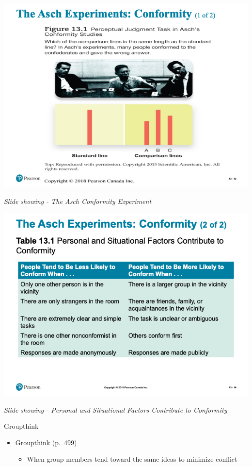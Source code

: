 \documentclass[
]{book}
\providecommand{\tightlist}{%
  \setlength{\itemsep}{0pt}\setlength{\parskip}{0pt}}
\begin{document}
\begin{reflect}
\includegraphics{assets/unit_6/slide_13.png}

\emph{Slide showing - The Asch Conformity Experiment}

\includegraphics{assets/unit_6/slide_14.png}

\emph{Slide showing - Personal and Situational Factors Contribute to Conformity}

Groupthink

\begin{itemize}
\tightlist
\item
  Groupthink (p.~499)

  \begin{itemize}
  \tightlist
  \item
    When group members tend toward the same ideas to minimize conflict
  \end{itemize}
\end{itemize}


\end{reflect}
\end{document}
